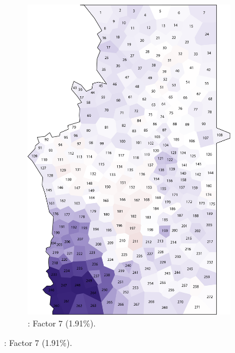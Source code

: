 \documentclass[output=paper]{LSP/langsci}
\begin{document}
\begin{figure}
\begin{subfigure}[t]{0.3\textwidth}
\includegraphics[width=\textwidth]{illustrations/pickl_fig8}
\caption{: Factor 7 (1.91\%).}
\label{fig:pickl:8}
\end{subfigure}
\end{figure}
\end{document}
